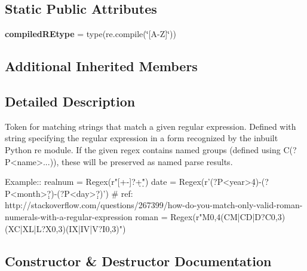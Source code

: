\subsection*{Static Public Attributes}
\begin{DoxyCompactItemize}
\item 
\mbox{\label{classsetuptools_1_1__vendor_1_1pyparsing_1_1_regex_aea3ba60353e2d9d2b47b2e5ebc0a4785}} 
{\bfseries compiled\+R\+Etype} = type(re.\+compile(\char`\"{}\mbox{[}A-\/Z\mbox{]}\char`\"{}))
\end{DoxyCompactItemize}
\subsection*{Additional Inherited Members}


\subsection{Detailed Description}
\begin{DoxyVerb}Token for matching strings that match a given regular expression.
Defined with string specifying the regular expression in a form recognized by the inbuilt Python re module.
If the given regex contains named groups (defined using C{(?P<name>...)}), these will be preserved as 
named parse results.

Example::
    realnum = Regex(r"[+-]?\d+\.\d*")
    date = Regex(r'(?P<year>\d{4})-(?P<month>\d\d?)-(?P<day>\d\d?)')
    # ref: http://stackoverflow.com/questions/267399/how-do-you-match-only-valid-roman-numerals-with-a-regular-expression
    roman = Regex(r"M{0,4}(CM|CD|D?C{0,3})(XC|XL|L?X{0,3})(IX|IV|V?I{0,3})")
\end{DoxyVerb}
 

\subsection{Constructor \& Destructor Documentation}
\mbox{\label{classsetuptools_1_1__vendor_1_1pyparsing_1_1_regex_a2bf2a91eb8c1faa95c32ec015dfe6a2a}} 
